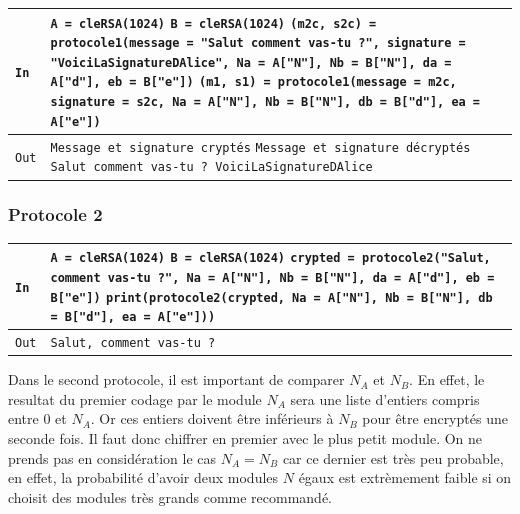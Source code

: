 \documentclass[titlepage]{article}
\begin{document}
    

    \begin{tabularx}{12cm}{|p{0.60cm}|X|}
        \hline
        \rowcolor{gray} \texttt{In} & \texttt{A = cleRSA(1024)} \newline
        \texttt{B = cleRSA(1024)} \newline
        \texttt{(m2c, s2c) = protocole1(message = "Salut comment vas-tu ?", signature = "VoiciLaSignatureDAlice", Na = A["N"], Nb = B["N"], da = A["d"], eb = B["e"])} \newline
        \texttt{(m1, s1) = protocole1(message = m2c, signature = s2c, Na = A["N"], Nb = B["N"], db = B["d"], ea = A["e"])} \\
        \hline
        \texttt{Out} & \texttt{Message et signature cryptés} \newline
        \texttt{Message et signature décryptés} \newline
        \texttt{Salut comment vas-tu ? VoiciLaSignatureDAlice} \\
        \hline
    \end{tabularx}
    \bigbreak

    \subsubsection{Protocole 2}

    

    \begin{tabularx}{12cm}{|p{0.60cm}|X|}
        \hline
        \rowcolor{gray} \texttt{In} & \texttt{A = cleRSA(1024)} \newline
        \texttt{B = cleRSA(1024)} \newline
        \texttt{crypted = protocole2("Salut, comment vas-tu ?", Na = A["N"], Nb = B["N"], da = A["d"], eb = B["e"])} \newline
        \texttt{print(protocole2(crypted, Na = A["N"], Nb = B["N"], db = B["d"], ea = A["e"]))} \\
        \hline
        \texttt{Out} & \texttt{Salut, comment vas-tu ?} \\
        \hline
    \end{tabularx}
    \bigbreak

    Dans le second protocole, il est important de comparer $N_A$ et $N_B$. En effet, le resultat du premier codage par le module $N_A$ sera une liste d'entiers compris entre 0 et $N_A$. Or ces entiers doivent être inférieurs à $N_B$ pour être encryptés une seconde fois. Il faut donc chiffrer en premier avec le plus petit module.
    On ne prends pas en considération le cas $N_A=N_B$ car ce dernier est très peu probable, en effet, la probabilité d'avoir deux modules $N$ égaux est extrèmement faible si on choisit des modules très grands comme recommandé.
\end{document}
